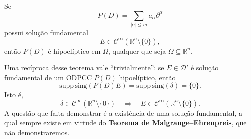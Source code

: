 \documentclass[../distribution_theory_notes.tex]{subfiles}
\begin{document}
\begin{theorem*}
	Se
	\[
		P(D)=\sum_{|\alpha|\leq m}a_{\alpha}\partial^{\alpha}
	\]
	possui solução fundamental
	\[
		E\in\mathcal{C}^{\infty}(\mathbb{R}^{n}\setminus\{0\}),
	\]
	então \(P(D)\) é hipoelíptico em \(\Omega\), qualquer que seja \(\Omega\subseteq\mathbb{R}^{n}\).
\end{theorem*}

\begin{tcolorbox}[
		skin=enhanced,
		title=Observação,
		fonttitle=\bfseries,
		colframe=black,
		colbacktitle=cyan!75!white,
		colback=cyan!15,
		colbacklower=black,
		coltitle=black,
		drop fuzzy shadow,
	]
	Uma recíproca desse teorema vale ``trivialmente'': se \(E\in\mathcal{D}'\) é solução fundamental de um ODPCC \(P(D)\) hipoelíptico, então
	\[
		\mathrm{supp\,sing}(P(D)E)
		=\mathrm{supp\,sing}(\delta)=\{0\}.
	\]
	Isto é,
	\[
		\delta\in\mathcal{C}^{\infty}(\mathbb{R}^{n}\setminus\{0\})
		\quad\Longrightarrow\quad
		E\in\mathcal{C}^{\infty}(\mathbb{R}^{n}\setminus\{0\}).
	\]
	A questão que falta demonstrar é a existência de uma solução fundamental, a qual sempre existe em virtude do \textbf{Teorema de Malgrange--Ehrenpreis}, que não demonstraremos.
\end{tcolorbox}
\end{document}
